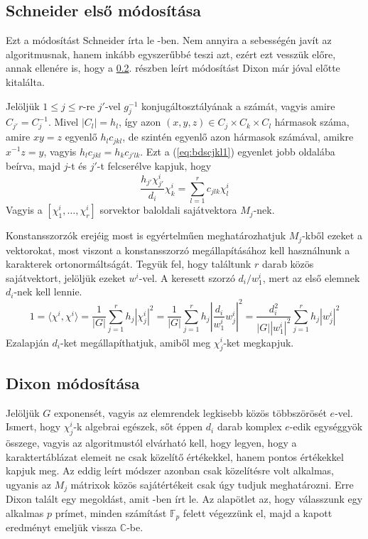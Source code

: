 \subsection{Schneider első módosítása}
\label{subsec:bdssch1}
Ezt a módosítást Schneider írta le \cite{Sch90}-ben.
Nem annyira a sebességén javít az algoritmusnak, hanem inkább egyszerűbbé teszi azt, ezért ezt vesszük előre,
annak ellenére is, hogy a \ref{subsec:bdsdixon}. részben leírt módosítást Dixon már jóval előtte kitalálta.

Jelöljük $1\le j \le r$-re $j'$-vel $g_j^{-1}$ konjugáltosztályának a számát,
vagyis amire $C_{j'}=C_j^{-1}$. Mivel $|C_l|=h_l$, így azon $(x, y, z)\in C_j \times C_k \times C_l$ hármasok száma,
amire $xy=z$ egyenlő $h_l c_{jkl}$, de szintén egyenlő azon hármasok számával, amikre $x^{-1}z=y$, vagyis $h_l c_{jkl}=h_k c_{j'lk}$.
Ezt a (\ref{eq:bdscjkl1}) egyenlet jobb oldalába beírva, majd $j$-t és $j'$-t felcserélve kapjuk, hogy
\begin{equation}
\label{eq:bdssch1}
\frac{h_{j'}\chi^i_{j'}}{d_i}\chi^i_k=\sum_{l=1}^r c_{jlk}\chi^i_l
\end{equation}
Vagyis a $[\chi^i_1, \dots, \chi^i_r]$ sorvektor baloldali sajátvektora $M_j$-nek.

Konstansszorzók erejéig most is egyértelműen meghatározhatjuk $M_j$-kből ezeket a vektorokat, most viszont a konstansszorzó megállapításához
kell használnunk a karakterek ortonormáltságát. Tegyük fel, hogy találtunk $r$ darab közös sajátvektort, jelöljük ezeket $w^i$-vel.
A keresett szorzó $d_i/w^i_1$, mert az első elemnek $d_i$-nek kell lennie.
\begin{equation}
\label{eq:bdssch2}
1 = \langle \chi^i, \chi^i \rangle = \frac{1}{|G|}\sum_{j=1}^r h_j |\chi^i_j|^2 = \frac{1}{|G|}\sum_{j=1}^r h_j \left|\frac{d_i}{w^i_1} w^i_j\right|^2 = 
\frac{d_i^2}{|G| |w^i_1|^2} \sum_{j=1}^r h_j |w^i_j|^2
\end{equation}
Ezalapján $d_i$-ket megállapíthatjuk, amiből meg $\chi^i_j$-ket megkapjuk.

\subsection{Dixon módosítása}
\label{subsec:bdsdixon}
Jelöljük $G$ exponensét, vagyis az elemrendek legkisebb közös többszörösét $e$-vel.
Ismert, hogy $\chi^i_j$-k algebrai egészek, sőt éppen $d_i$ darab komplex $e$-edik egységgyök összege,
vagyis az algoritmustól elvárható kell, hogy legyen, hogy a karaktertáblázat elemeit ne csak közelítő értékekkel, hanem pontos értékekkel kapjuk meg.
Az eddig leírt módszer azonban csak közelítésre volt alkalmas, ugyanis az $M_j$ mátrixok közös sajátértékeit csak úgy tudjuk meghatározni.
Erre Dixon talált egy megoldást, amit \cite{Dix67}-ben írt le. Az alapötlet az, hogy válasszunk egy alkalmas $p$ prímet, minden számítást $\mathbb{F}_p$
felett végezzünk el, majd a kapott eredményt emeljük vissza $\mathbb{C}$-be.

